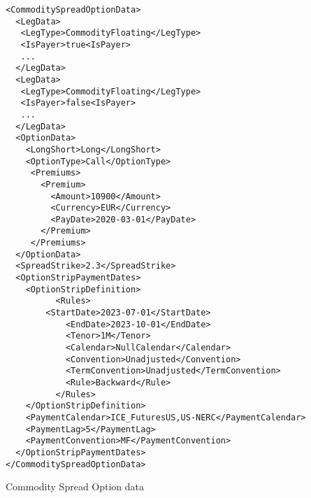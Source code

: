\begin{listing}[H]
    \begin{verbatim}
<CommoditySpreadOptionData>
  <LegData>
   <LegType>CommodityFloating</LegType>
   <IsPayer>true<IsPayer>
   ...
  </LegData>
  <LegData>
   <LegType>CommodityFloating</LegType>
   <IsPayer>false<IsPayer>
   ...
  </LegData>
  <OptionData>
    <LongShort>Long</LongShort>
    <OptionType>Call</OptionType>
     <Premiums>
       <Premium>
         <Amount>10900</Amount>
         <Currency>EUR</Currency>
         <PayDate>2020-03-01</PayDate>
       </Premium>
     </Premiums>
  </OptionData>
  <SpreadStrike>2.3</SpreadStrike>
  <OptionStripPaymentDates>
  	<OptionStripDefinition>
          <Rules>
	    <StartDate>2023-07-01</StartDate>
            <EndDate>2023-10-01</EndDate>
            <Tenor>1M</Tenor>
            <Calendar>NullCalendar</Calendar>
            <Convention>Unadjusted</Convention>
            <TermConvention>Unadjusted</TermConvention>
            <Rule>Backward</Rule>
          </Rules>
  	</OptionStripDefinition>
    <PaymentCalendar>ICE_FuturesUS,US-NERC</PaymentCalendar>
    <PaymentLag>5</PaymentLag>
    <PaymentConvention>MF</PaymentConvention>
  </OptionStripPaymentDates>
</CommoditySpreadOptionData>
    \end{verbatim}
    \caption{Commodity Spread Option data}
    \label{lst:com_s_option_data}
\end{listing}
